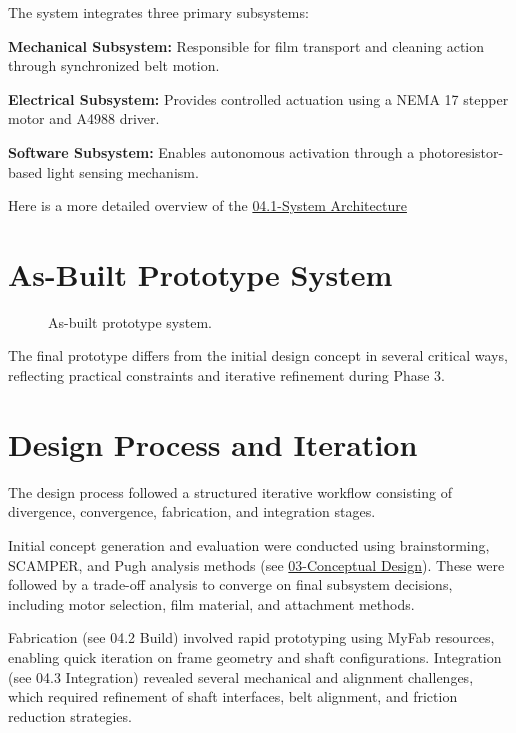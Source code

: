 \documentclass[12pt]{article}
\begin{document}
The system integrates three primary subsystems:

\textbf{Mechanical Subsystem:} Responsible for film transport and cleaning action through synchronized belt motion.

\textbf{Electrical Subsystem:} Provides controlled actuation using a NEMA 17 stepper motor and A4988 driver.

\textbf{Software Subsystem:} Enables autonomous activation through a photoresistor-based light sensing mechanism.

 Here is a more detailed overview of the \href{https://docs.google.com/document/d/1Fe0dRtZV8c90UYq46zju22RK1K1eeR_mjBnPMjBk4DA/edit?tab=t.0}{04.1-System Architecture}

\section{As-Built Prototype System}

\begin{figure}[H]
    \centering
    \caption{As-built prototype system.}
\end{figure}

The final prototype differs from the initial design concept in several critical ways, reflecting practical constraints and iterative refinement during Phase 3.

\section{Design Process and Iteration}

The design process followed a structured iterative workflow consisting of divergence, convergence, fabrication, and integration stages.

Initial concept generation and evaluation were conducted using brainstorming, SCAMPER, and Pugh analysis methods (see \href{https://drive.google.com/drive/u/4/folders/1H7HwvAO-qYqSBoSMpMYzfeY-mcBnA41G}{03-Conceptual Design}). These were followed by a trade-off analysis to converge on final subsystem decisions, including motor selection, film material, and attachment methods.

Fabrication (see 04.2 Build) involved rapid prototyping using MyFab resources, enabling quick iteration on frame geometry and shaft configurations. Integration (see 04.3 Integration) revealed several mechanical and alignment challenges, which required refinement of shaft interfaces, belt alignment, and friction reduction strategies.
\end{document}
